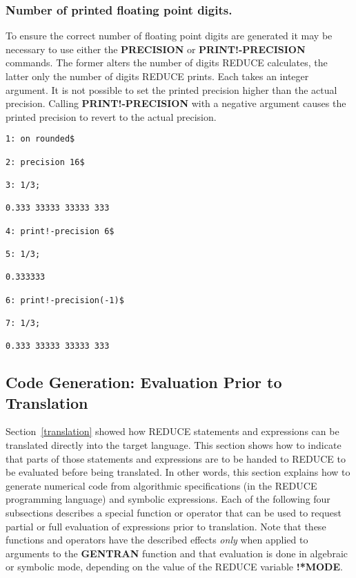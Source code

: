 \subsubsection{Number of printed floating point digits.}
 
To ensure the correct number of floating point digits are
generated it may be necessary to use either the {\bf PRECISION} or
{\bf PRINT!-PRECISION} commands.  The former alters the number of
digits REDUCE calculates, the latter only the number of digits REDUCE
prints.  Each takes an integer argument.  It is not possible to set
the printed precision higher than the actual precision.  Calling {\bf
PRINT!-PRECISION} with a negative argument causes the printed
precision to revert to the actual precision.

\begin{verbatim}
1: on rounded$

2: precision 16$

3: 1/3;

0.333 33333 33333 333

4: print!-precision 6$

5: 1/3;

0.333333

6: print!-precision(-1)$

7: 1/3;

0.333 33333 33333 333
\end{verbatim}

\subsection{Code Generation:  Evaluation Prior to Translation}
\label{generation}
Section~\ref{translation} showed how REDUCE statements and expressions
can be translated directly into the target language.  This section
shows how to indicate that parts of those statements and expressions
are to be handed to REDUCE to be evaluated before being translated.
In other words, this section explains how to generate numerical code
from algorithmic specifications (in the REDUCE programming language)
and symbolic expressions.  Each of the following four subsections
describes a special function or operator that can be used to request
partial or full evaluation of expressions prior to translation.  Note
that these functions and operators have the described effects {\it
only} when applied to arguments to the {\bf GENTRAN} function and that
evaluation is done in algebraic or symbolic mode, depending on the
value of the REDUCE variable {\bf !*MODE}.

